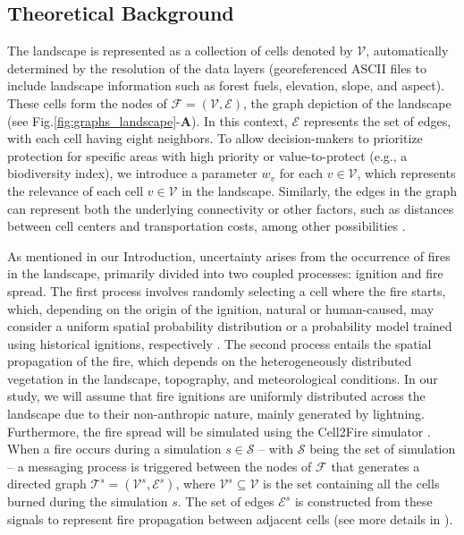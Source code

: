 \documentclass[a4paper,fleqn]{cas-sc}
\begin{document}
\subsection{Theoretical Background}
The landscape is represented as a collection of cells denoted by $\mathcal{V}$, automatically determined by the resolution of the data layers (georeferenced ASCII files to include landscape information such as forest fuels, elevation, slope, and aspect). These cells form the  nodes of $\mathcal{F} = (\mathcal{V}, \mathcal{E})$, the graph depiction of the landscape (see Fig.\:\ref{fig:graphs_landscape}-\textbf{A}). In this context, $\mathcal{E}$ represents the set of edges, with each cell having eight neighbors. To allow decision-makers to prioritize protection for specific areas with high priority or value-to-protect (e.g., a biodiversity index), we introduce a parameter $w_v$ for each $v \in \mathcal{V}$, which represents the relevance of each cell $v \in \mathcal{V}$ in the landscape. Similarly, the edges in the graph can represent both the underlying connectivity or other factors, such as distances between cell centers and transportation costs, among other possibilities \citep{carrasco2023firebreak}.

As mentioned in our Introduction, uncertainty arises from the occurrence of fires in the landscape, primarily divided into two coupled processes: ignition and fire spread. The first process involves randomly selecting a cell where the fire starts, which, depending on the origin of the ignition, natural or human-caused, may consider a uniform spatial probability distribution or a probability model trained using historical ignitions, respectively \citep{carrasco2021exploring}. The second process entails the spatial propagation of the fire, which depends on the heterogeneously distributed vegetation in the landscape, topography, and meteorological conditions. In our study, we will assume that fire ignitions are uniformly distributed across the landscape due to their non-anthropic nature, mainly generated by lightning. Furthermore, the fire spread will be simulated using the Cell2Fire simulator \citep{pais2021cell2fire}. When a fire occurs during a simulation $s \in \mathcal{S}$ -- with $\mathcal{S}$ being the set of simulation -- a messaging process is triggered between the nodes of $\mathcal{F}$ that generates a directed graph $\mathcal{T}^s = (\mathcal{V}^s, \mathcal{E}^s)$, where $\mathcal{V}^s \subseteq \mathcal{V}$ is the set containing all the cells burned during the simulation $s$. The set of edges $\mathcal{E}^s$ is constructed from these signals to represent fire propagation between adjacent cells (see more details in \cite{pais2021downstream}).
\end{document}
